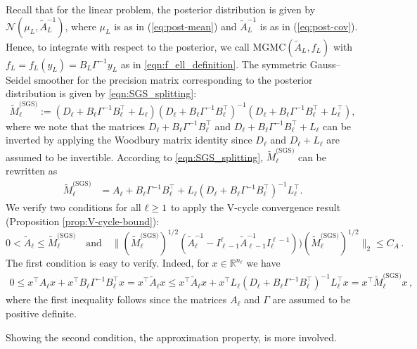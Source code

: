 \documentclass[11pt,english]{article}
\theoremstyle{plain}
\theoremstyle{plain}
\theoremstyle{plain}
\theoremstyle{plain}
\numberwithin{equation}{section}
\begin{document}
Recall that for the linear problem, the posterior distribution is
given by $\mathcal{N}(\mu_{L},\widetilde{A}_{L}^{-1})$, where $\mu_{L}$
is as in (\ref{eq:post-mean}) and $\widetilde{A}_{L}^{-1}$ is as
in (\ref{eq:post-cov}). Hence, to integrate with respect to the posterior,
we call $\mathrm{MGMC}(\widetilde{A}_{L},f_{L})$ with $f_{L}=f_{L}(y_{L})
	=B_L \Gamma^{-1}y_L$ as in \eqref{eqn:f_ell_definition}.
The symmetric Gauss--Seidel smoother for the precision matrix corresponding
to the posterior distribution is given by \eqref{eqn:SGS_splitting}:
\[
	\widetilde{M}_{\ell}^{\text{(SGS)}}:=(D_{\ell}+B_{\ell}\Gamma^{-1}B_{\ell}^{\top}+L_{\ell})(D_{\ell}+B_{\ell}\Gamma^{-1}B_{\ell}^{\top})^{-1}(D_{\ell}+B_{\ell}\Gamma^{-1}B_{\ell}^{\top}+L_{\ell}^{\top}),
\]
where we note that the matrices $D_{\ell}+B_{\ell}\Gamma^{-1}B_{\ell}^{\top}$
and $D_{\ell}+B_{\ell}\Gamma^{-1}B_{\ell}^{\top}+L_{\ell}$ can be
inverted by applying the Woodbury matrix identity since $D_{\ell}$
and $D_{\ell}+L_{\ell}$ are assumed to be invertible. According to \eqref{eqn:SGS_splitting},
$\widetilde{M}_{\ell}^{\text{(SGS)}}$ can be rewritten as
\begin{align}
	\widetilde{M}_{\ell}^{\text{(SGS)}} & =A_{\ell}+B_{\ell}\Gamma^{-1}B_{\ell}^{\top}+L_{\ell}\left(D_{\ell}+B_{\ell}\Gamma^{-1}B_{\ell}^{\top}\right)^{-1}L_{\ell}^{\top}.\label{eq:tildeM-SGS-formula}
\end{align}
We verify two conditions for all $\text{\ensuremath{\ell\geq1}}$ to apply the V-cycle convergence result (Proposition \ref{prop:V-cycle-bound}):
\[
  0<\widetilde{A}_{\ell}\leq\widetilde{M}_{\ell}^{\text{(SGS)}}
  \quad \text{and} %
  \quad \|(\widetilde{M}_{\ell}^{\text{(SGS)}})^{1/2}(\widetilde{A}_{\ell}^{-1}-I_{\ell-1}^{\ell}\widetilde{A}_{\ell-1}^{-1}I_{\ell}^{\ell-1}))(\widetilde{M}_{\ell}^{\text{(SGS)}})^{1/2}\|_{2}\leq C_{A}\,
  .
  \]
The first condition is easy to verify. Indeed, for $x\in\mathbb{R}^{n_{\ell}}$
we have
\begin{align*}
	0 \leq x^\top A_{\ell}x+x^\top B_{\ell}\Gamma^{-1}B_{\ell}^{\top}x = x^{\top}\widetilde{A}_{\ell}x \leq x^{\top}\widetilde{A}_{\ell}x+x^{\top}L_{\ell}\left(D_{\ell}+B_{\ell}\Gamma^{-1}B_{\ell}^{\top}\right)^{-1}L_{\ell}^{\top}x  = x^{\top}\widetilde{M}_{\ell}^{\text{(SGS)}}x\,,
\end{align*}
where the first inequality follows since the matrices $A_{\ell}$ and $\Gamma$ are assumed to be positive definite.

Showing the second condition, the approximation property, is more involved.
\end{document}
